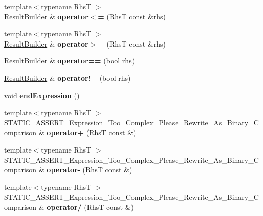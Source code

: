 \begin{DoxyCompactItemize}
{\footnotesize template$<$typename RhsT $>$ }\\\hyperlink{classCatch_1_1ResultBuilder}{Result\+Builder} \& {\bfseries operator$<$=} (RhsT const \&rhs)
\item 
\mbox{\label{classCatch_1_1ExpressionLhs_a21d30d6026ff2b1f86ddbd6b0a90d036}} 
{\footnotesize template$<$typename RhsT $>$ }\\\hyperlink{classCatch_1_1ResultBuilder}{Result\+Builder} \& {\bfseries operator$>$=} (RhsT const \&rhs)
\item 
\mbox{\label{classCatch_1_1ExpressionLhs_a6001030bcfbabc3981013ddffb3e3bb6}} 
\hyperlink{classCatch_1_1ResultBuilder}{Result\+Builder} \& {\bfseries operator==} (bool rhs)
\item 
\mbox{\label{classCatch_1_1ExpressionLhs_a71e48da9a894962e8b32a8af5359a4df}} 
\hyperlink{classCatch_1_1ResultBuilder}{Result\+Builder} \& {\bfseries operator!=} (bool rhs)
\item 
\mbox{\label{classCatch_1_1ExpressionLhs_a13d2551a927790284fb5ddf1ee2c9079}} 
void {\bfseries end\+Expression} ()
\item 
\mbox{\label{classCatch_1_1ExpressionLhs_a29ffb8417e977f0a98c0eb537a7ca5af}} 
{\footnotesize template$<$typename RhsT $>$ }\\S\+T\+A\+T\+I\+C\+\_\+\+A\+S\+S\+E\+R\+T\+\_\+\+Expression\+\_\+\+Too\+\_\+\+Complex\+\_\+\+Please\+\_\+\+Rewrite\+\_\+\+As\+\_\+\+Binary\+\_\+\+Comparison \& {\bfseries operator+} (RhsT const \&)
\item 
\mbox{\label{classCatch_1_1ExpressionLhs_a19ef0a33442bb18efef1ec65102151d1}} 
{\footnotesize template$<$typename RhsT $>$ }\\S\+T\+A\+T\+I\+C\+\_\+\+A\+S\+S\+E\+R\+T\+\_\+\+Expression\+\_\+\+Too\+\_\+\+Complex\+\_\+\+Please\+\_\+\+Rewrite\+\_\+\+As\+\_\+\+Binary\+\_\+\+Comparison \& {\bfseries operator-\/} (RhsT const \&)
\item 
\mbox{\label{classCatch_1_1ExpressionLhs_a37d50565046ac9b1c9159a7c0cf88a1e}} 
{\footnotesize template$<$typename RhsT $>$ }\\S\+T\+A\+T\+I\+C\+\_\+\+A\+S\+S\+E\+R\+T\+\_\+\+Expression\+\_\+\+Too\+\_\+\+Complex\+\_\+\+Please\+\_\+\+Rewrite\+\_\+\+As\+\_\+\+Binary\+\_\+\+Comparison \& {\bfseries operator/} (RhsT const \&)

\end{DoxyCompactItemize}
